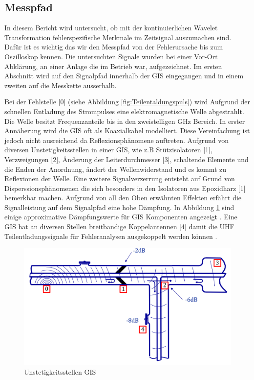 \begin{refsection}
\section{Messpfad}
In diesem Bericht wird untersucht, ob mit der kontinuierlichen Wavelet Transformation fehlerspezifische Merkmale im Zeitsignal auszumachen sind. 
Dafür ist es wichtig das wir den Messpfad von der Fehlerursache bis zum Oszilloskop kennen. 
Die untersuchten Signale wurden bei einer Vor-Ort Abklärung, an einer Anlage die im Betrieb war, aufgezeichnet.  
Im ersten Abschnitt wird auf den Signalpfad innerhalb der GIS eingegangen und in einem zweiten auf die Messkette ausserhalb.

Bei der Fehlstelle [0] (siehe Abbildung \ref{fig:Teilentaldungspuls}) wird Aufgrund der schnellen Entladung des Strompulses eine elektromagnetische Welle abgestrahlt. 
Die Welle besitzt Frequenzanteile bis in den zweistelligen GHz Bereich. 
In erster Annäherung wird die GIS oft als Koaxialkabel modelliert. 
Diese Vereinfachung ist jedoch nicht ausreichend da Reflexionsphänomene auftreten. 
Aufgrund von diversen Unstetigkeitsstellen in einer GIS, wie z.B Stützisolatoren [1], Verzweigungen [2],  Änderung der Leiterdurchmesser [3], schaltende Elemente und die Enden der Anordnung, ändert der Wellenwiderstand und es kommt zu Reflexionen der Welle.
Eine weitere Signalverzerrung entsteht auf Grund von Disperssionsphänomenen die sich besonders in den Isolatoren aus Epoxidharz [1] bemerkbar machen. 
Aufgrund von all den Oben erwähnten Effekten erfährt die Signalleistung auf dem Signalpfad eine hohe Dämpfung.
In Abbildung \ref{fig:messketteingis} sind einige approximative Dämpfungswerte für GIS Komponenten angezeigt \cite{report:PDBasicABB}.
Eine GIS hat an diversen Stellen breitbandige Koppelantennen [4] damit die UHF Teilentladungssignale für Fehleranalysen ausgekoppelt werden können \cite{buch:UHFSignale, skript:Judd24ps, buch:Kuchler}.
\begin{figure}
	\centering
	\includegraphics[width=0.5\linewidth]{papers/gis/Bilder/MessketteInGIS}
	\caption{Unstetigkeitsstellen GIS \cite{report:PDBasicABB}}
	\label{fig:messketteingis}
\end{figure}


\end{refsection}
